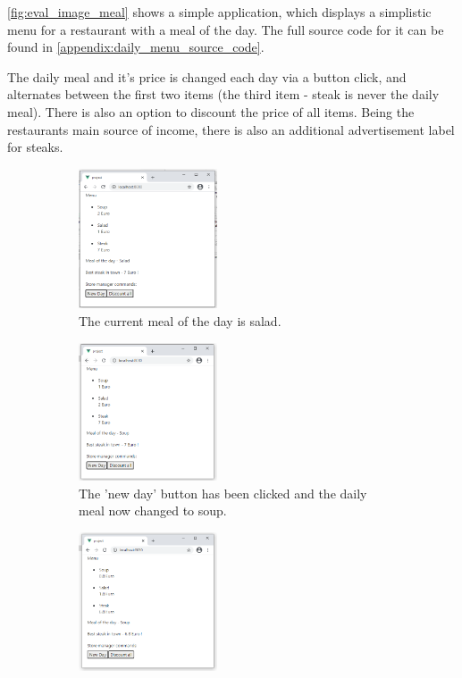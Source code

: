 \ref{fig:eval_image_meal} shows a simple application, which displays a simplistic menu for a restaurant with a meal of the day. The full source code for it can be found in \ref{appendix:daily_menu_source_code}.

The daily meal and it's price is changed each day via a button click, and alternates between the first two items (the third item - steak is never the daily meal). There is also an option to discount the price of all items. Being the restaurants main source of income, there is also an additional advertisement label for steaks.
\begin{figure}[H]
    \centering
    \begin{subfigure}[b]{0.45\textwidth}
         \centering
         \includegraphics[width=0.45\textwidth]{images/meal_1.png}
         \caption{The current meal of the day is salad.}
    \end{subfigure}\hfill%
    \begin{subfigure}[b]{0.45\textwidth}
        \centering
        \includegraphics[width=0.45\textwidth]{images/meal_2.png}
        \caption{The 'new day' button has been clicked and the daily meal now changed to soup.}
    \end{subfigure}\hfill%
    \begin{subfigure}[b]{0.45\textwidth}
        \centering
        \includegraphics[width=0.45\textwidth]{images/meal_3.png}

\end{subfigure}
\end{figure}
